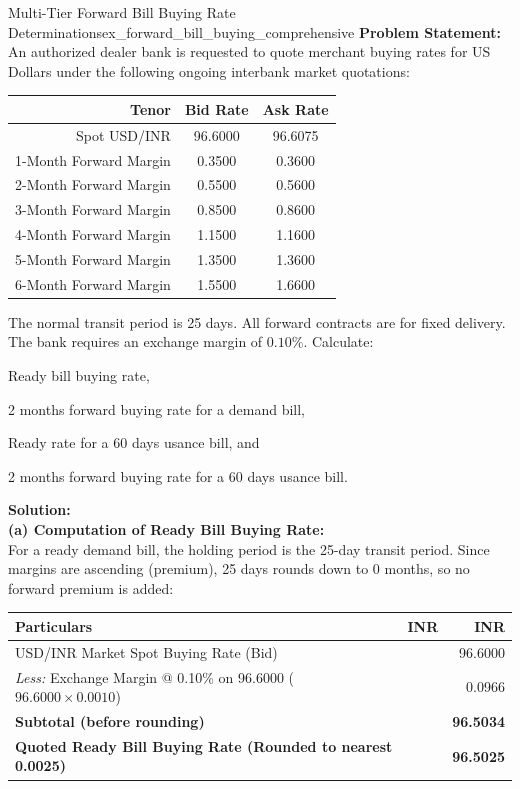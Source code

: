 \begin{example}{Multi-Tier Forward Bill Buying Rate Determinations}{ex_forward_bill_buying_comprehensive}
\textbf{Problem Statement:}\\
An authorized dealer bank is requested to quote merchant buying rates for US Dollars under the following ongoing interbank market quotations:
\begin{center}
\begin{tabular}{rcc}
    \toprule
    \textbf{Tenor} & \textbf{Bid Rate} & \textbf{Ask Rate} \\
    \midrule
    Spot USD/INR & 96.6000 & 96.6075 \\
    1-Month Forward Margin & 0.3500 & 0.3600 \\
    2-Month Forward Margin & 0.5500 & 0.5600 \\
    3-Month Forward Margin & 0.8500 & 0.8600 \\
    4-Month Forward Margin & 1.1500 & 1.1600 \\
    5-Month Forward Margin & 1.3500 & 1.3600 \\
    6-Month Forward Margin & 1.5500 & 1.6600 \\
    \bottomrule
\end{tabular}
\end{center}
The normal transit period is 25 days. All forward contracts are for fixed delivery. The bank requires an exchange margin of $0.10\%$. Calculate:
\begin{enumerate*}[label=(\alph*)]
    \item Ready bill buying rate,
    \item 2 months forward buying rate for a demand bill,
    \item Ready rate for a 60 days usance bill, and
    \item 2 months forward buying rate for a 60 days usance bill.
\end{enumerate*}

\tcblower
\textbf{Solution:}\\[0.4em]
\noindent\textbf{(a) Computation of Ready Bill Buying Rate:}\\
For a ready demand bill, the holding period is the 25-day transit period. Since margins are ascending (premium), 25 days rounds down to 0 months, so no forward premium is added:
\begin{center}
\begin{tabularx}{0.96\linewidth}{Xrr}
    \toprule
    \textbf{Particulars} & \textbf{INR} & \textbf{INR} \\
    \midrule
    USD/INR Market Spot Buying Rate (Bid) & & 96.6000 \\
    \textit{Less:} Exchange Margin @ 0.10\% on 96.6000 ($96.6000 \times 0.0010$) & & 0.0966 \\
    \midrule
    \textbf{Subtotal (before rounding)} & & \textbf{96.5034} \\
    \textbf{Quoted Ready Bill Buying Rate (Rounded to nearest 0.0025)} & & \textbf{96.5025} \\
    \bottomrule
\end{tabularx}
\end{center}


\end{example}
